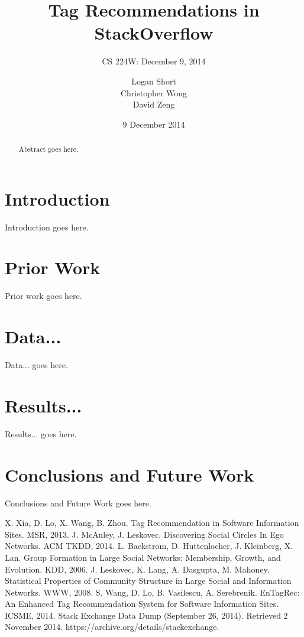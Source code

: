 \documentclass{acm_proc_article-sp}
\begin{document}
\setlength{\parindent}{15pt}

\title{Tag Recommendations in StackOverflow}
\subtitle{CS 224W: December 9, 2014}

\author{
  \alignauthor
  Logan Short\\
  \alignauthor
  Christopher Wong\\
  \alignauthor
  David Zeng\\
}

\date{9 December 2014}

\maketitle

\begin{abstract}
Abstract goes here.
\end{abstract}

\section{Introduction}
Introduction goes here.

\section{Prior Work}
Prior work goes here.

\section{Data...}
Data... goes here.

\section{Results...}
Results... goes here.

\section{Conclusions and Future Work}
Conclusions and Future Work goes here.

\begin{thebibliography}{1}
 X. Xia, D. Lo, X. Wang, B. Zhou. Tag Recommendation in Software Information Sites. MSR, 2013.
 J. McAuley, J. Leskovec. Discovering Social Circles In Ego Networks. ACM TKDD, 2014.
 L. Backstrom, D. Huttenlocher, J. Kleinberg, X. Lan. Group Formation in Large Social Networks: Membership, Growth, and Evolution. KDD, 2006.
 J. Leskovec, K. Lang, A. Dasgupta, M. Mahoney. Statistical Properties of Community Structure in Large Social and Information Networks. WWW, 2008.
 S. Wang, D. Lo, B. Vasilescu, A. Serebrenik. EnTagRec: An Enhanced Tag Recommendation System for Software Information Sites. ICSME, 2014.
 Stack Exchange Data Dump (September 26, 2014). Retrieved 2 November 2014. https://archive.org/details/stackexchange.
\end{thebibliography}

\end{document}
